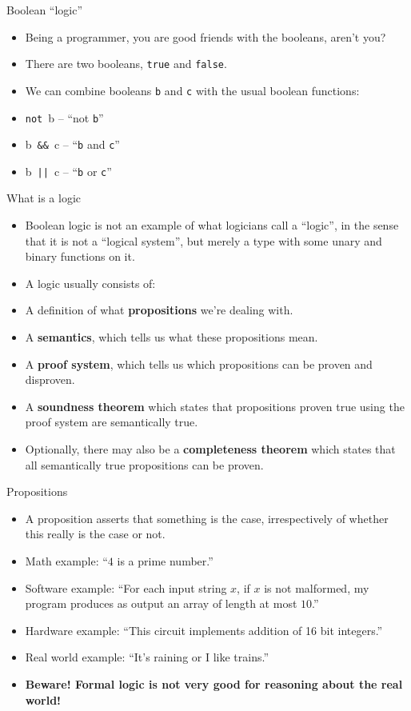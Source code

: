 \documentclass{beamer}
\newcommand{\m}[1]{\texttt{#1}}
\newcommand{\mnotb}[1]{\m{not}\ #1}
\newcommand{\mandb}[2]{#1\ \m{\&\&}\ #2}
\newcommand{\morb}[2]{#1\ \m{||}\ #2}
\begin{document}
\begin{frame}{Boolean ``logic''}
\begin{itemize}
	\item Being a programmer, you are good friends with the booleans, aren't you?
	\item There are two booleans, \m{true} and \m{false}.
	\item We can combine booleans \m{b} and \m{c} with the usual boolean functions:
	\item \mnotb{b} -- ``not \m{b}''
	\item \mandb{b}{c} -- ``\m{b} and \m{c}''
	\item \morb{b}{c} -- ``\m{b} or \m{c}''
\end{itemize}
\end{frame}

\begin{frame}{What is a logic}
\begin{itemize}
	\item Boolean logic is not an example of what logicians call a ``logic'', in the sense that it is not a ``logical system'', but merely a type with some unary and binary functions on it.
	\item A logic usually consists of:
	\item A definition of what \textbf{propositions} we're dealing with.
	\item A \textbf{semantics}, which tells us what these propositions mean.
	\item A \textbf{proof system}, which tells us which propositions can be proven and disproven.
	\item A \textbf{soundness theorem} which states that propositions proven true using the proof system are semantically true.
	\item Optionally, there may also be a \textbf{completeness theorem} which states that all semantically true propositions can be proven.
\end{itemize}
\end{frame}

\begin{frame}{Propositions}
\begin{itemize}
	\item A proposition asserts that something is the case, irrespectively of whether this really is the case or not.
	\item Math example: ``$4$ is a prime number.''
	\item Software example: ``For each input string $x$, if $x$ is not malformed, my program produces as output an array of length at most $10$.''
	\item Hardware example: ``This circuit implements addition of 16 bit integers.''
	\item Real world example: ``It's raining or I like trains.''
	\item \textbf{Beware! Formal logic is not very good for reasoning about the real world!}
\end{itemize}
\end{frame}
\end{document}

